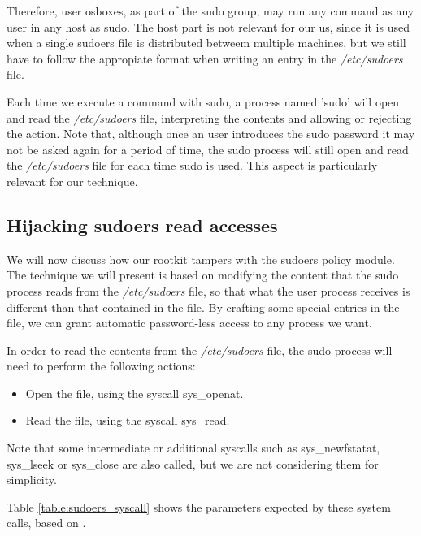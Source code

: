 Therefore, user osboxes, as part of the sudo group, may run any command as any user in any host as sudo. The host part is not relevant for our us, since it is used when a single sudoers file is distributed betweem multiple machines, but we still have to follow the appropiate format when writing an entry in the \textit{/etc/sudoers} file.

Each time we execute a command with sudo, a process named 'sudo' will open and read the \textit{/etc/sudoers} file, interpreting the contents and allowing or rejecting the action. Note that, although once an user introduces the sudo password it may not be asked again for a period of time, the sudo process will still open and read the \textit{/etc/sudoers} file for each time sudo is used. This aspect is particularly relevant for our technique.


\subsection{Hijacking sudoers read accesses}
We will now discuss how our rootkit tampers with the sudoers policy module. The technique we will present is based on modifying the content that the sudo process reads from the \textit{/etc/sudoers} file, so that what the user process receives is different than that contained in the file. By crafting some special entries in the file, we can grant automatic password-less access to any process we want.

In order to read the contents from the \textit{/etc/sudoers} file, the sudo process will need to perform the following actions:
\begin{itemize}
\item Open the file, using the syscall sys\_openat.
\item Read the file, using the syscall sys\_read.
\end{itemize}

Note that some intermediate or additional syscalls such as sys\_newfstatat, sys\_lseek or sys\_close are also called, but we are not considering them for simplicity.

Table \ref{table:sudoers_syscall} shows the parameters expected by these system calls, based on \cite{syscall_reference}.

